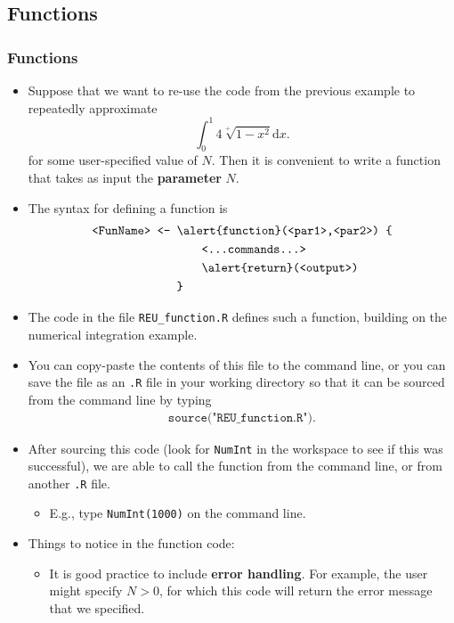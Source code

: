 \documentclass{beamer}
\begin{document}
\subsection{Functions}

\begin{frame}[allowframebreaks]
 \frametitle{Functions}

	\begin{itemize}
		\item
		Suppose that we want to re-use the code from the previous example to repeatedly approximate 
		$$		
		\int_0^1 4 \sqrt[+]{1 - x^2} \mathrm d x.
		$$
		for some user-specified value of $N$. Then it is convenient to write a function that takes as input the \textbf{parameter} $N$.
		\item
		The syntax for defining a function is
		\begin{align*}
			\texttt{<FunName> <- } & \texttt{\alert{function}(<par1>,<par2>) } \texttt{\{} \\
			& \qquad \texttt{<...commands...>} \\
			& \qquad \texttt{\alert{return}(<output>)} \\
			&\texttt{\}}			
		\end{align*}
		\item
		The code in the file \texttt{\scriptsize REU\_function.R} defines such a function, building on the numerical integration example.
		\item
		You can copy-paste the contents of this file to the command line, or you can save the file as an \texttt{.R} file in your working directory so that it can be sourced from the command line by typing
		\begin{align*}
			\texttt{source("REU\_function.R")}.
		\end{align*}
		\item
		After sourcing this code (look for \texttt{NumInt} in the workspace to see if this was successful), we are able to call the function from the command line, or from another \texttt{.R} file.
		\begin{itemize}
			\item
			E.g., type \texttt{NumInt(1000)} on the command line.
		\end{itemize}
		\vskip4cm
		\item
		Things to notice in the function code:
		\begin{itemize}
			\item
			It is good practice to include \textbf{error handling}. For example, the user might specify $N > 0$, for which this code will return the error message that we specified.

\end{itemize}
\end{itemize}
\end{frame}
\end{document}
